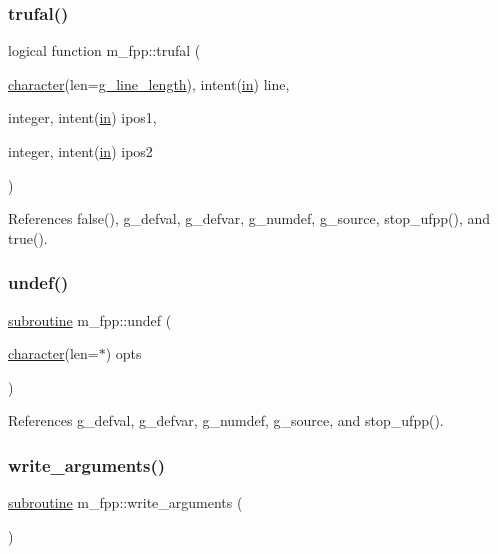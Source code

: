 \subsubsection{\texorpdfstring{trufal()}{trufal()}}
{\footnotesize\ttfamily logical function m\+\_\+fpp\+::trufal (\begin{DoxyParamCaption}\item[{\hyperlink{option__stopwatch_83_8txt_abd4b21fbbd175834027b5224bfe97e66}{character}(len=\hyperlink{namespacem__fpp_ab93f8756cf248cf8db932573009d4664}{g\+\_\+line\+\_\+length}), intent(\hyperlink{M__journal_83_8txt_afce72651d1eed785a2132bee863b2f38}{in})}]{line,  }\item[{integer, intent(\hyperlink{M__journal_83_8txt_afce72651d1eed785a2132bee863b2f38}{in})}]{ipos1,  }\item[{integer, intent(\hyperlink{M__journal_83_8txt_afce72651d1eed785a2132bee863b2f38}{in})}]{ipos2 }\end{DoxyParamCaption})}



References false(), g\+\_\+defval, g\+\_\+defvar, g\+\_\+numdef, g\+\_\+source, stop\+\_\+ufpp(), and true().

\mbox{\label{namespacem__fpp_aa3c22b47ddfcf47940f8254d4a44c448}} 
\subsubsection{\texorpdfstring{undef()}{undef()}}
{\footnotesize\ttfamily \hyperlink{M__stopwatch_83_8txt_acfbcff50169d691ff02d4a123ed70482}{subroutine} m\+\_\+fpp\+::undef (\begin{DoxyParamCaption}\item[{\hyperlink{option__stopwatch_83_8txt_abd4b21fbbd175834027b5224bfe97e66}{character}(len=$\ast$)}]{opts }\end{DoxyParamCaption})}



References g\+\_\+defval, g\+\_\+defvar, g\+\_\+numdef, g\+\_\+source, and stop\+\_\+ufpp().

\mbox{\label{namespacem__fpp_a2b24b85d02a85630ee16ee81d5277c28}} 
\subsubsection{\texorpdfstring{write\+\_\+arguments()}{write\_arguments()}}
{\footnotesize\ttfamily \hyperlink{M__stopwatch_83_8txt_acfbcff50169d691ff02d4a123ed70482}{subroutine} m\+\_\+fpp\+::write\+\_\+arguments (\begin{DoxyParamCaption}{ }\end{DoxyParamCaption})}




